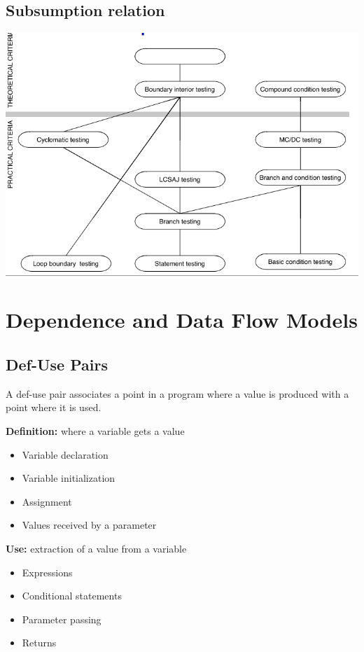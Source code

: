 \documentclass{article}
\begin{document}
\subsection{Subsumption relation}
\includegraphics[scale=0.7]{subsumption_testing}

\section{Dependence and Data Flow Models}

\subsection{Def-Use Pairs}
A def-use pair associates a point in a program where a value is produced with a point where it is used.

\textbf{Definition:} where a variable gets a value
\begin{itemize}
  \item Variable declaration
  \item Variable initialization
  \item Assignment
  \item Values received by a parameter
\end{itemize}

\textbf{Use:} extraction of a value from a variable
\begin{itemize}
  \item Expressions
  \item Conditional statements
  \item Parameter passing
  \item Returns
\end{itemize}
\end{document}
